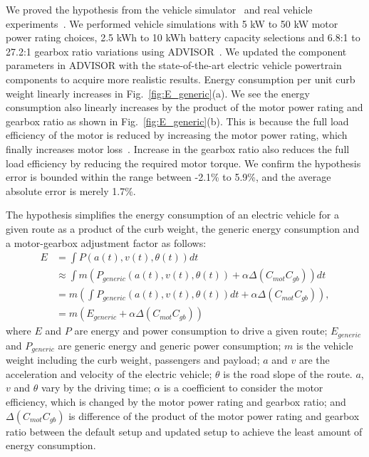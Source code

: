\documentclass[journal]{IEEEtran}
\begin{document}
We proved  the hypothesis from the vehicle simulator~\cite{Markel:JPS02} and real vehicle experiments~\cite{Chang:ICCAD14}. %
We performed vehicle simulations with 5 kW to 50 kW motor power rating choices, 2.5 kWh to 10 kWh battery capacity selections and 6.8:1 to 27.2:1 gearbox ratio variations using ADVISOR~\cite{Markel:JPS02}. We updated the component parameters in ADVISOR with the state-of-the-art electric vehicle powertrain components to acquire more realistic results. 
Energy consumption per unit curb weight linearly increases in Fig.~\ref{fig:E_generic}(a). We see the energy consumption also linearly increases by the product of the motor power rating and gearbox ratio as shown in Fig.~\ref{fig:E_generic}(b). This is because the full load efficiency of the motor is reduced by increasing the motor power rating, which finally increases motor loss~\cite{motor_eff}. Increase in the gearbox ratio also reduces the full load efficiency by reducing the required motor torque. We confirm the hypothesis error is bounded within the range between -2.1\% to 5.9\%, and the average absolute error is merely 1.7\%.

The hypothesis simplifies the energy consumption of an electric vehicle for a given route as a product of the curb weight, the generic energy consumption and a motor-gearbox adjustment factor as follows:
 \begin{align} 
E 	&= \int P(a(t), v(t), \theta(t)) dt \nonumber \\  
	&\approx \int m (P_{generic}(a(t), v(t), \theta(t)) + \alpha \Delta (C_{mot}C_{gb})) dt\nonumber \\  
	&= m (\int P_{generic}(a(t), v(t), \theta(t)) dt + \alpha \Delta (C_{mot}C_{gb})), \nonumber \\
	&= m (E_{generic} + \alpha \Delta (C_{mot}C_{gb})) \nonumber
\end{align}
where $E$ and $P$ are energy and power consumption to drive a given route; $E_{generic}$ and $P_{generic}$ are generic energy and generic power consumption; $m$ is the vehicle weight including the curb weight, passengers and payload; $a$ and $v$ are the acceleration and velocity of the electric vehicle; $\theta$ is the road slope of the route. $a$, $v$ and $\theta$ vary by the driving time;
$\alpha$ is a coefficient to consider the motor efficiency, which is changed by the motor power rating and gearbox ratio; and $\Delta (C_{mot}C_{gb})$ is difference of the product of the motor power rating and gearbox ratio between the default setup and updated setup to achieve the least amount of energy consumption.
\end{document}
